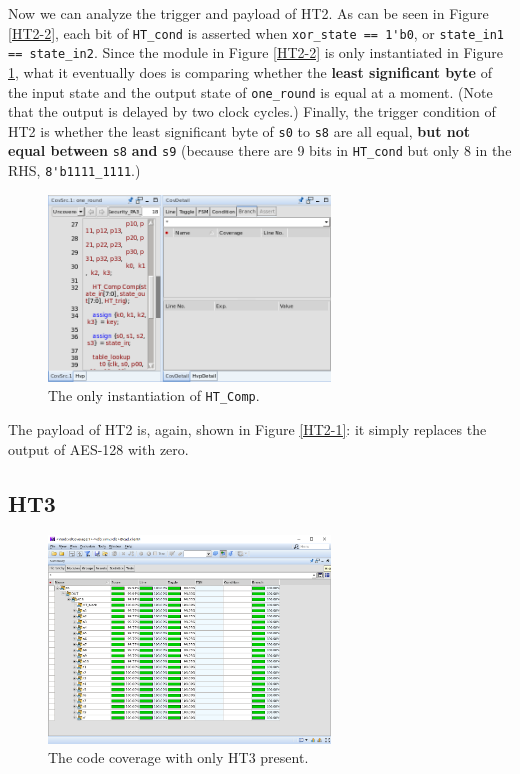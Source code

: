 \documentclass{article}
\begin{document}
Now we can analyze the trigger and payload of HT2. As can be seen in Figure \ref{HT2-2}, each bit of \verb|HT_cond| is asserted when \verb|xor_state == 1'b0|, or \verb|state_in1 == state_in2|. Since the module in Figure \ref{HT2-2} is only instantiated in Figure \ref{HT2-3}, what it eventually does is comparing whether the \textbf{least significant byte} of the input state and the output state of \verb|one_round| is equal at a moment. (Note that the output is delayed by two clock cycles.) Finally, the trigger condition of HT2 is whether the least significant byte of \verb|s0| to \verb|s8| are all equal, \textbf{but not equal between} \verb|s8| \textbf{and} \verb|s9| (because there are 9 bits in \verb|HT_cond| but only 8 in the RHS, \verb|8'b1111_1111|.)

\begin{figure}[htp] \centering
\includegraphics[width=0.666667\textwidth]{HT2-3}
\caption{The only instantiation of \texttt{HT\_Comp}.}
\label{HT2-3}
\end{figure}

The payload of HT2 is, again, shown in Figure \ref{HT2-1}: it simply replaces the output of AES-128 with zero.

\subsection{HT3}

\begin{figure}[htp] \centering
\includegraphics[width=0.666667\textwidth]{nHT12}
\caption{The code coverage with only HT3 present.}
\label{nHT12}
\end{figure}
\end{document}
